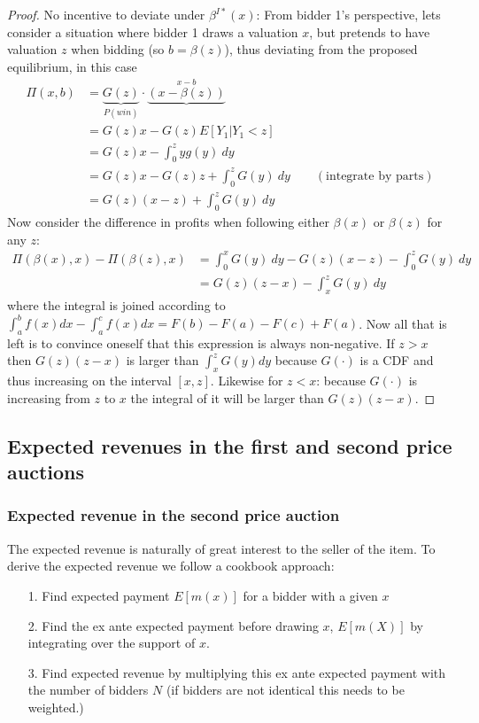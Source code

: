 \begin{proof}{No incentive to deviate under $\beta^{I*}(x)$:} From bidder 1's perspective, lets consider a situation where bidder 1 draws a valuation $x$, but pretends to have valuation $z$ when bidding (so $b = \beta(z)$), thus deviating from the proposed equilibrium, in this case
  \begin{equation}
    \begin{split}
      \Pi(x, b) &= \underbrace{G(z)}_{P(win)} \cdot \underbrace{(x - \beta(z))}^{x - b} \\
      &= G(z) x - G(z)E[Y_1 | Y_1 < z] \\
      &= G(z) x - \int_0^z yg(y) \ dy \\
      &= G(z) x - G(z) z + \int_0^z G(y) \ dy \qquad (\textrm{integrate by parts}) \\
      &= G(z)(x-z) + \int_0^z G(y) \ dy
    \end{split}
  \end{equation}
Now consider the difference in profits when following either $\beta(x)$ or $\beta(z)$ for any $z$:
\begin{equation}
  \begin{split}
    \Pi(\beta(x), x) - \Pi(\beta(z), x) &= \int_0^x G(y) \ dy - G(z)(x-z) - \int_0^z G(y) \ dy \\
    &= G(z)(z-x) - \int_x^z G(y) \ dy
  \end{split}
\end{equation}
where the integral is joined according to $\int_a^b f(x) dx - \int_a^c f(x) dx = F(b)-F(a)-F(c)+F(a)$. Now all that is left is to convince oneself that this expression is always non-negative. If $z>x$ then $G(z)(z-x)$ is larger than $\int_x^z G(y) dy$ because $G(\cdot)$ is a CDF and thus increasing on the interval $[x,z]$. Likewise for $z<x$: because $G(\cdot)$ is increasing from $z$ to $x$ the integral of it will be larger than $G(z)(z-x)$.
\end{proof}

\subsection{Expected revenues in the first and second price auctions}
\subsubsection{Expected revenue in the second price auction}
The expected revenue is naturally of great interest to the seller of the item. To derive the expected revenue we follow a cookbook approach:
\begin{itemize}
  \item[1.] Find expected payment $E[m(x)]$ for a bidder with a given $x$
  \item[2.] Find the ex ante expected payment before drawing $x$, $E[m(X)]$ by integrating over the support of $x$.
  \item[3.] Find expected revenue by multiplying this ex ante expected payment with the number of bidders $N$ (if bidders are not identical this needs to be weighted.)
\end{itemize}

